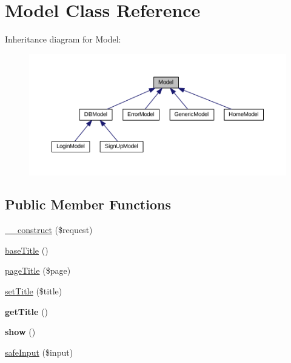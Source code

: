 \hypertarget{classModel}{\section{Model Class Reference}
\label{classModel}
}


Inheritance diagram for Model\+:
\nopagebreak
\begin{figure}[H]
\begin{center}
\leavevmode
\includegraphics[width=350pt]{classModel__inherit__graph}
\end{center}
\end{figure}
\subsection*{Public Member Functions}
\begin{DoxyCompactItemize}
\item 
\hyperlink{classModel_a6cdf6d42c65dfc104d7ff60d23550b50}{\+\_\+\+\_\+construct} (\$request)
\item 
\hyperlink{classModel_abd27409e82e2413a8083c22fe73740b9}{base\+Title} ()
\item 
\hyperlink{classModel_a729bceb5699b258da651b948433c0543}{page\+Title} (\$page)
\item 
\hyperlink{classModel_a618dc24391e96f5dabb021f7a91f310c}{set\+Title} (\$title)
\item 
\hypertarget{classModel_a76514c143747205243903e09facf6383}{{\bfseries get\+Title} ()}\label{classModel_a76514c143747205243903e09facf6383}

\item 
\hypertarget{classModel_a0f7d2666269cc8b1b1072c6cbb6ac9e4}{{\bfseries show} ()}\label{classModel_a0f7d2666269cc8b1b1072c6cbb6ac9e4}

\item 
\hyperlink{classModel_a55ed5897d135030216ef6e68a83c9cce}{safe\+Input} (\$input)
\end{DoxyCompactItemize}
